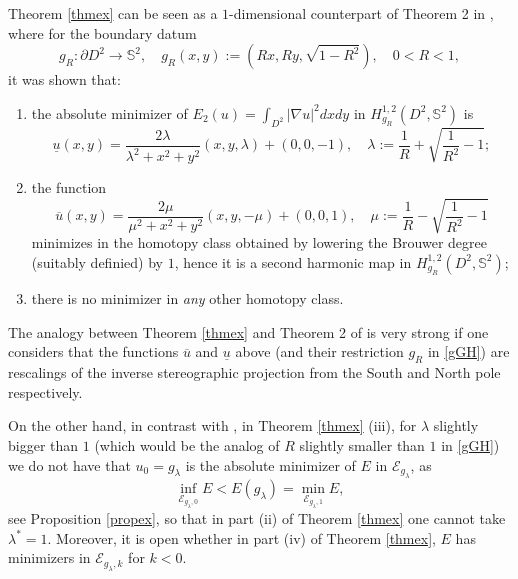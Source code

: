 \documentclass[12pt, a4paper]{article}
\newcommand{\M}[1]{\mathcal{#1}}
\newcommand{\sph}{\mathbb{S}}
\newcommand{\blu}[1]{{\color{blue}#1}}
\renewcommand{\(}{\left(}
\renewcommand{\)}{\right)}
\begin{document}
Theorem \ref{thmex} can be seen as a $1$-dimensional counterpart of Theorem 2 in \cite{bc}, where for the boundary datum 
\begin{equation}\label{gGH}
g_R:\partial D^2\to \sph^2,\quad g_R(x,y):=(Rx,Ry,\sqrt{1-R^2}), \quad 0<R<1,
\end{equation}
it was shown that:
\begin{enumerate}
\item the absolute minimizer of $E_2(u)=\int_{D^2}|\nabla u|^2dxdy$ in $H^{1,2}_{g_R}(D^2,\sph^2)$ is
$$\underline{u}(x,y)=\frac{2\lambda}{\lambda^2+x^2+y^2}(x,y,\lambda)+(0,0,-1),\quad \lambda:=\frac{1}{R}+\sqrt{\frac{1}{R^2}-1} ;$$
\item the function
$$\overline{u}(x,y)=\frac{2\mu}{\mu^2+x^2+y^2}(x,y,-\mu)+(0,0,1),\quad \mu:=\frac{1}{R}-\sqrt{\frac{1}{R^2}-1}$$
minimizes in the homotopy class obtained by lowering the Brouwer degree (suitably definied) by $1$, hence it is a second harmonic map in $H^{1,2}_{g_R}(D^2,\sph^2)$;
\item there is no minimizer in \emph{any} other homotopy class.
\end{enumerate}

The analogy between Theorem \ref{thmex} and Theorem 2 of \cite{bc} is very strong if one considers that the functions $\overline u$ and $\underline u$ above (and their restriction $g_R$ in \eqref{gGH}) are rescalings of the inverse stereographic projection from the South and North pole respectively. 

On the other hand, in contrast with \cite[Thm. 2]{bc}, %
 in Theorem \ref{thmex} (iii), for $\lambda$ slightly bigger than $1$ (which would be the analog of $R$ slightly smaller than $1$ in \eqref{gGH}) we do not have that $u_0=g_\lambda$ is the absolute minimizer of $E$ in $\M{E}_{g_\lambda}$, as
$$\inf_{\M{E}_{g_\lambda,0}} E < E(g_\lambda)=\min_{\M{E}_{g_\lambda,1}}E,$$
see Proposition \ref{propex}, so that in part (ii) of Theorem \ref{thmex} one cannot take $\lambda^*=1$. 
Moreover, it is open whether in part (iv) of Theorem \ref{thmex}, $E$ has minimizers in $\M{E}_{g_\lambda,k}$ for $k<0$.
\end{document}
